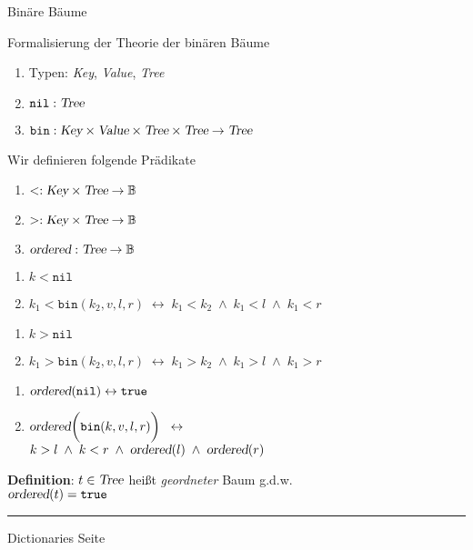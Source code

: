 \begin{slide}{}
\normalsize

\begin{center}
Bin\"are B\"aume
\end{center}
\vspace*{0.5cm}

\footnotesize
Formalisierung der Theorie der bin\"aren B\"aume 
\begin{enumerate}
\item Typen: \textsl{Key}, \textsl{Value}, \textsl{Tree}
\item $\mathtt{nil}: \textsl{Tree}$
\item $\mathtt{bin}: \textsl{Key} \times \textsl{Value} \times \textsl{Tree} \times \textsl{Tree} \rightarrow \textsl{Tree}$
\end{enumerate}
Wir definieren folgende Pr\"adikate 
\begin{enumerate}
\item $<: \textsl{Key} \times \textsl{Tree} \rightarrow \mathbb{B}$ 
\item $>: \textsl{Key} \times \textsl{Tree} \rightarrow \mathbb{B}$ 
\item $\textsl{ordered}: \textsl{Tree} \rightarrow \mathbb{B}$ 
\end{enumerate}
\begin{enumerate}
\item $k < \mathtt{nil}$
\item $k_1 < \mathtt{bin}(k_2, v, l, r) \;\leftrightarrow\; k_1 < k_2 \;\wedge\; k_1 < l \;\wedge\; k_1 < r$
\end{enumerate}
\begin{enumerate}
\item $k > \mathtt{nil}$
\item $k_1 > \mathtt{bin}(k_2, v, l, r) \;\leftrightarrow\; k_1 > k_2 \;\wedge\; k_1 > l \;\wedge\; k_1 > r$
\end{enumerate}
\begin{enumerate}
\item $\textsl{ordered}(\mathtt{nil}) \leftrightarrow \mathtt{true}$
\item $\textsl{ordered}\bigg(\mathtt{bin}(k,v,l,r)\bigg) \;\;\leftrightarrow\;$ \\[0.3cm]
      \hspace*{1.3cm} $k > l \;\wedge\; k < r \;\wedge\; \textsl{ordered}(l) \;\wedge\; \textsl{ordered}(r)$
\end{enumerate}
\textbf{Definition}: $t \in \textsl{Tree}$ hei{\ss}t \emph{geordneter} Baum g.d.w. \\[0.3cm]
\hspace*{1.3cm} $\textsl{ordered}(t) = \mathtt{true}$

\vspace*{\fill}
\tiny \addtocounter{mypage}{1}
\rule{17cm}{1mm}
Dictionaries  \hspace*{\fill} Seite 
\end{slide}

